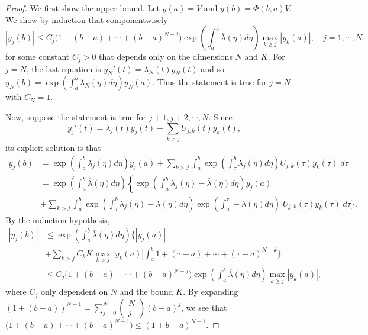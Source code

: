 \documentclass[a4paper,11pt]{article}
\newcommand{\upl}{\overline{\lambda}}
\theoremstyle{remark}
\begin{document}
\begin{proof}
 
We first show the upper bound. Let $y(a) = V$ and $y(b)= \Phi(b,a)V$.
We show by induction that componentwisely
 $$|y_j(b)| \le C_j \Big(1 + (b-a) + \cdots + (b-a)^{N-j} \Big) \exp\left(\int_a^b \upl(\eta) d\eta\right)\max_{k\ge j}|y_k(a)|, \quad j=1,\cdots,N$$
for some constant $C_j>0$ that depends only on the dimensions $N$ and $K$.
For $j=N$, the last equation is $y_N'(t) = \lambda_N(t)y_N(t)$ and so $y_N(b) = \exp\left(\int_a^b \lambda_N(\eta) d\eta\right)y_N(a)$. Thus the statement is true for $j=N$ with $C_N=1$.
 
 Now, suppose the statement is true for $j+1, j+2, \cdots, N$. Since
 $$ y_j'(t) = \lambda_j(t) y_j(t) + \sum_{k>j} U_{j,k}(t)y_k(t),$$
 its explicit solution is that
 \begin{align*}
  y_j(b) &= \exp\left(\int_a^b \lambda_j(\eta) d\eta\right)y_j(a) + \sum_{k>j} \int_a^b \exp\left(\int_\tau^b \lambda_j(\eta) d\eta\right)U_{j,k}(\tau)y_k(\tau)\; d\tau\\
  &=\exp\left(\int_a^b \upl(\eta) d\eta\right)\left\{\exp\left(\int_a^b \lambda_j(\eta)-\upl(\eta) d\eta\right)y_j(a) \right.\\
  &+ \sum_{k>j}\int_a^b \exp\left(\int_\tau^b \lambda_j(\eta)-\upl(\eta) d\eta\right)\exp\left(\int_a^\tau -\upl(\eta) d\eta\right)\; U_{j,k}(\tau)y_k(\tau)\;d\tau \bigg\}.
 \end{align*}
 By the induction hypothesis,
 \begin{align*}
  |y_j(b)| &\le \exp\left(\int_a^b \upl(\eta) d\eta\right)\bigg\{ |y_j(a)|  \\
  &+  \sum_{k>j} C_k K  \max_{k>j}|y_k(a)|\int_a^b 1+(\tau-a)+ \cdots + (\tau-a)^{N-k} \bigg\}\\
  &\le C_j\Big(1 + (b-a) + \cdots + (b-a)^{N-j} \Big) \exp\left(\int_a^b \upl(\eta) d\eta\right)\max_{k\ge j}|y_k(a)|,
 \end{align*}
 where $C_j$ only dependent on $N$ and the bound $K$. By expanding $(1+(b-a))^{N-1} = \displaystyle \sum_{j=0}^N \begin{pmatrix} N\\j \end{pmatrix} (b-a)^j$, we see that $\Big(1 + (b-a) + \cdots + (b-a)^{N-1} \Big) \le (1+b-a)^{N-1}$.
 

\end{proof}
\end{document}
